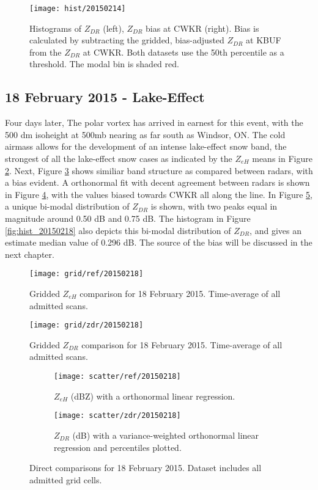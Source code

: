 \begin{figure}[p]
\texttt{[image: hist/20150214]}\centering
\caption{Histograms of $Z_{DR}$ (left), $Z_{DR}$ bias at CWKR (right). Bias is calculated by subtracting the gridded, bias-adjusted $Z_{DR}$ at KBUF from the
$Z_{DR}$ at CWKR. Both datasets use the 50th percentile as a threshold. The modal bin is shaded red.} 
\label{fig:hist_20150214}
\end{figure}

\subsection{18 February 2015 - Lake-Effect}
Four days later, The polar vortex has arrived in earnest for this event, with the 500 dm isoheight at 500mb nearing as far south as Windsor, ON. The cold airmass allows for the development of an intense lake-effect snow band, the strongest of all the lake-effect snow cases as indicated by the $Z_{eH}$ means in Figure \ref{fig:grid_ref_20150218}. Next, Figure \ref{fig:grid_zdr_20150218} shows similiar band structure as compared between radars, with a bias evident. A orthonormal fit with decent agreement between radars is shown in Figure \ref{fig:scatter_ref_20150218}, with the values biased towards CWKR all along the line. In Figure \ref{fig:scatter_zdr_20150218}, a unique bi-modal distribution of $Z_{DR}$ is shown, with two peaks equal in magnitude around 0.50 dB and 0.75 dB. The histogram in Figure \ref{fig:hist_20150218} also depicts this bi-modal distribution of $Z_{DR}$, and gives an estimate median value of 0.296 dB. The source of the bias will be discussed in the next chapter. 
\begin{figure}[H]
\texttt{[image: grid/ref/20150218]}
\caption{Gridded $Z_{eH}$ comparison for 18 February 2015. Time-average of all admitted scans.} 
\label{fig:grid_ref_20150218}
\end{figure}

\begin{figure}[p]
\texttt{[image: grid/zdr/20150218]}
\caption{Gridded $Z_{DR}$ comparison for 18 February 2015. Time-average of all admitted scans.} 
\label{fig:grid_zdr_20150218}
\end{figure}

\begin{figure}[p]
\centering
   \begin{subfigure}[t]{0.48\linewidth} \centering
     \texttt{[image: scatter/ref/20150218]}
     \caption{$Z_{eH}$ (dBZ) with a orthonormal linear regression.}\label{fig:scatter_ref_20150218}
   \end{subfigure}
   \begin{subfigure}[t]{0.48\linewidth} \centering
     \texttt{[image: scatter/zdr/20150218]}
     \caption{$Z_{DR}$ (dB) with a variance-weighted orthonormal linear regression and percentiles plotted.}\label{fig:scatter_zdr_20150218}
   \end{subfigure}
\caption{Direct comparisons for 18 February 2015. Dataset includes all admitted grid cells.} \label{fig:scatter_20150218}
\end{figure}

